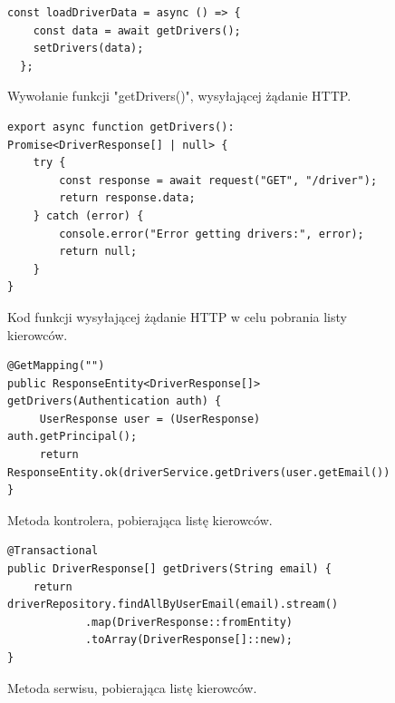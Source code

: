\begin{figure}
\centering
\begin{lstlisting}
const loadDriverData = async () => {
    const data = await getDrivers();
    setDrivers(data);
  };
\end{lstlisting}
\caption{Wywołanie funkcji "getDrivers()", wysyłającej żądanie HTTP.}
\label{fig:kod:startRequest}
\end{figure}

\begin{figure}
\centering
\begin{lstlisting}
export async function getDrivers(): Promise<DriverResponse[] | null> {
    try {
        const response = await request("GET", "/driver");
        return response.data;
    } catch (error) {
        console.error("Error getting drivers:", error);
        return null;
    }
}
\end{lstlisting}
\caption{Kod funkcji wysyłającej żądanie HTTP w celu pobrania listy kierowców.}
\label{fig:kod:getDrivers}
\end{figure}

\begin{figure}
\centering
\begin{lstlisting}
@GetMapping("")
public ResponseEntity<DriverResponse[]> getDrivers(Authentication auth) {
     UserResponse user = (UserResponse) auth.getPrincipal();
     return ResponseEntity.ok(driverService.getDrivers(user.getEmail()));
}
\end{lstlisting}
\caption{Metoda kontrolera, pobierająca listę kierowców.}
\label{fig:kod:controlerGetDrivers}
\end{figure}

\begin{figure}
\centering
\begin{lstlisting}
@Transactional
public DriverResponse[] getDrivers(String email) {
    return driverRepository.findAllByUserEmail(email).stream()
            .map(DriverResponse::fromEntity)
            .toArray(DriverResponse[]::new);
}
\end{lstlisting}
\caption{Metoda serwisu, pobierająca listę kierowców.}
\label{fig:kod:serviceGetDrivers}
\end{figure}